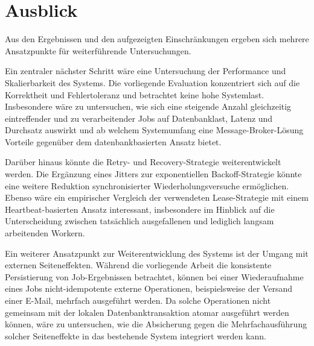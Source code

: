\section{Ausblick}
\label{sec:ausblick}
Aus den Ergebnissen und den aufgezeigten Einschränkungen ergeben sich mehrere Ansatzpunkte für weiterführende Untersuchungen.

Ein zentraler nächster Schritt wäre eine Untersuchung der Performance und Skalierbarkeit des Systems.
Die vorliegende Evaluation konzentriert sich auf die Korrektheit und Fehlertoleranz und betrachtet keine hohe Systemlast.
Insbesondere wäre zu untersuchen, wie sich eine steigende Anzahl gleichzeitig eintreffender und zu verarbeitender Jobs auf Datenbanklast,
Latenz und Durchsatz auswirkt und ab welchem Systemumfang eine Message-Broker-Lösung Vorteile gegenüber dem
datenbankbasierten Ansatz bietet.

Darüber hinaus könnte die Retry- und Recovery-Strategie weiterentwickelt werden.
Die Ergänzung eines Jitters zur exponentiellen Backoff-Strategie könnte eine weitere Reduktion synchronisierter Wiederholungsversuche ermöglichen.
Ebenso wäre ein empirischer Vergleich der verwendeten Lease-Strategie mit einem Heartbeat-basierten Ansatz interessant,
insbesondere im Hinblick auf die Unterscheidung zwischen tatsächlich ausgefallenen und lediglich langsam arbeitenden Workern.

Ein weiterer Ansatzpunkt zur Weiterentwicklung des Systems ist der Umgang mit externen Seiteneffekten.
Während die vorliegende Arbeit die konsistente Persistierung von Job-Ergebnissen betrachtet, können bei einer Wiederaufnahme
eines Jobs nicht-idempotente externe Operationen, beispielsweise der Versand einer E-Mail, mehrfach ausgeführt werden.
Da solche Operationen nicht gemeinsam mit der lokalen Datenbanktransaktion atomar ausgeführt werden können, wäre zu untersuchen,
wie die Absicherung gegen die Mehrfachausführung solcher Seiteneffekte in das bestehende System integriert werden kann.
